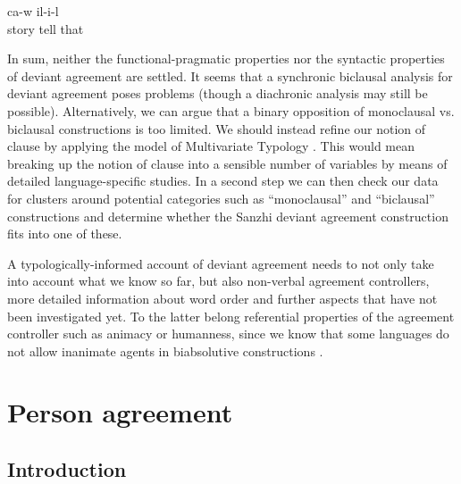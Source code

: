 \begin{exe}
	\ex	\label{ex:when, he was talking.}
		ca-w	il-i-l\\
		story	tell		that\\
	\glt	{}
\end{exe}

In sum, neither the functional-pragmatic properties nor the syntactic properties of deviant agreement are settled. It seems that a synchronic biclausal analysis for deviant agreement poses problems (though a diachronic analysis may still be possible). Alternatively, we can argue that a binary opposition of monoclausal vs. biclausal constructions is too limited. We should instead refine our notion of clause by applying the model of Multivariate Typology \citep{Bickel2011, Bickel2015}. This would mean breaking up the notion of clause into a sensible number of variables by means of detailed language-specific studies. In a second step we can then check our data for clusters around potential categories such as ``monoclausal'' and ``biclausal'' constructions and determine whether the Sanzhi deviant agreement construction fits into one of these.

A typologically-informed account of deviant agreement needs to not only take into account what we know so far, but also non-verbal agreement controllers, more detailed information about word order and further aspects that have not been investigated yet. To the latter belong referential properties of the agreement controller such as animacy or humanness, since we know that some languages do not allow inanimate agents in biabsolutive constructions \citep{Forker2012a}.



\section{Person agreement}
\label{sec:Person agreement}



\subsection{Introduction}
\label{ssec:IntroductionPersonAgreement}

